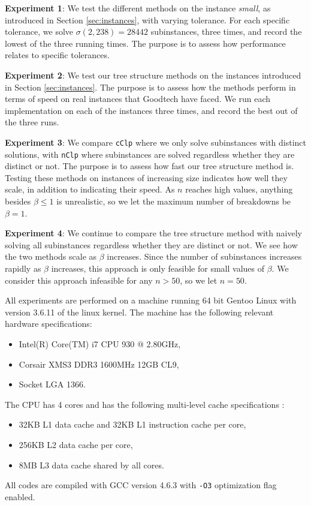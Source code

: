 \textbf{Experiment 1}:
We test the different
methods on the instance \textit{small}, as introduced in Section
\ref{sec:instances}, with varying tolerance.
For each specific tolerance, we solve $\sigma(2, 238) = 28442$ subinstances, three times,
and record the lowest of the three running times.
The purpose is to assess how performance relates to specific tolerances.

\textbf{Experiment 2}:
We test our tree structure methods on the instances introduced in Section
\ref{sec:instances}.
The purpose is to assess how the methods perform in terms of speed
on real instances that Goodtech have faced.
We run each implementation on each of the instances three times, and record
the best out of the three runs.

\textbf{Experiment 3}:
We compare \texttt{cClp} where we only solve subinstances with distinct
solutions, with \texttt{nClp} where subinstances are solved regardless
whether they are distinct or not.
The purpose is to assess how fast our tree structure method is.
Testing these methods on instances of increasing size indicates how well
they scale, in addition to indicating their speed. 
As $n$ reaches high values, anything besides $\beta \leq 1$ is unrealistic,
so we let the maximum number of breakdowns be $\beta = 1$.

\textbf{Experiment 4}:
We continue to compare the tree structure method with naively solving all
subinstances regardless whether they are distinct or not. We
see how the two methods scale as $\beta$ increases. Since the number
of subinstances increases rapidly as $\beta$ increases, this approach is only
feasible for small values of $\beta$. We consider this approach infeasible for
any $n > 50$, so we let $n = 50$.

All experiments are performed on a machine running 64 bit Gentoo Linux
with version 3.6.11 of the linux kernel. The machine has the following
relevant hardware specifications:
\begin{itemize}
    \item Intel(R) Core(TM) i7 CPU 930 @ 2.80GHz,
    \item Corsair XMS3 DDR3 1600MHz 12GB CL9,
    \item Socket LGA 1366.
\end{itemize}
The CPU has 4 cores and has the following multi-level cache specifications
\cite{intel}:
\begin{itemize}
    \item 32KB L1 data cache and 32KB L1 instruction cache per core,
    \item 256KB L2 data cache per core,
    \item 8MB L3 data cache shared by all cores.
\end{itemize}
All codes are compiled with GCC version 4.6.3 with \texttt{-O3}
optimization flag enabled.

